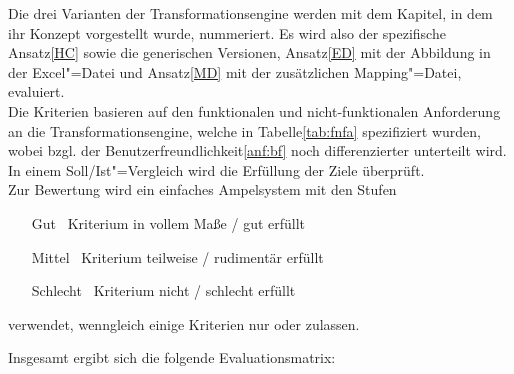 Die drei Varianten der Transformationsengine werden mit dem Kapitel, in dem ihr Konzept vorgestellt wurde, nummeriert. Es wird also der spezifische Ansatz\nbs\ref{HC} sowie die generischen Versionen, Ansatz\nbs\ref{ED} mit der Abbildung in der Excel"=Datei und Ansatz\nbs\ref{MD} mit der zusätzlichen Mapping"=Datei, evaluiert.\\
Die Kriterien basieren auf den funktionalen und nicht-funktionalen Anforderung an die Transformationsengine, welche in Tabelle\nbs\ref{tab:fnfa} spezifiziert wurden, wobei bzgl. der Benutzerfreundlichkeit\nbs\ref{anf:bf} noch differenzierter unterteilt wird. In einem Soll/Ist"=Vergleich wird die Erfüllung der Ziele überprüft.\\
Zur Bewertung wird ein einfaches Ampelsystem mit den Stufen
\begin{itemize}[leftmargin=7em]
\item[Gut \,\bgood] Kriterium in vollem Maße / gut erfüllt 
\item[Mittel \,\bokay] Kriterium teilweise / rudimentär erfüllt 
\item[Schlecht \,\bbad] Kriterium nicht / schlecht erfüllt
\end{itemize}
verwendet, wenngleich einige Kriterien nur \bgood[4pt] oder \bbad[4pt] zulassen.

Insgesamt ergibt sich die folgende Evaluationsmatrix:

